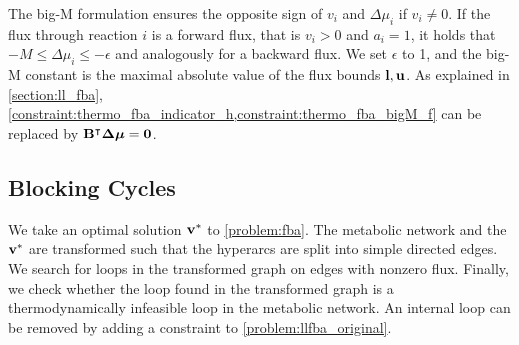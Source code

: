 The big-M formulation ensures the opposite sign of $v_i$ and $\Delta \mu_i$ if $v_i \neq 0$. If the flux through reaction $i$ is a forward flux, that is $v_i > 0$ and $a_i=1$, it holds that $-M \leq \Delta \mu_i \leq -\epsilon$ and analogously for a backward flux. We set $\epsilon$ to 1, and the big-M constant is the maximal absolute value of the flux bounds $\bold l, \bold u$. 
As explained in \cref{section:ll_fba}, \cref{constraint:thermo_fba_indicator_h,constraint:thermo_fba_bigM_f} can be replaced by $\bold B^\intercal \boldsymbol{\Delta \mu} = \bold 0$.

\subsection{Blocking Cycles} \label{section:blocking_cycles}
We take an optimal solution  $\bold v^*$ to \cref{problem:fba}. The metabolic network and the  $\bold v^*$ are transformed such that the hyperarcs are split into simple directed edges. We search for loops in the transformed graph on edges with nonzero flux. Finally, we check whether the loop found in the transformed graph is a thermodynamically infeasible loop in the metabolic network. An internal loop can be removed by adding a constraint to \cref{problem:llfba_original}. 

